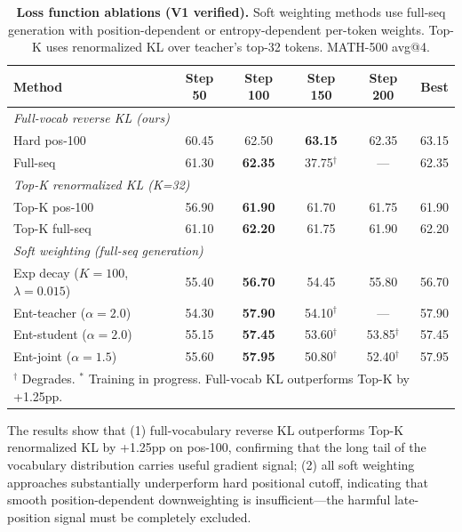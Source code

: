 \documentclass[10pt]{article}
\begin{document}
\begin{table}[!htbp]
\centering
\caption{\textbf{Loss function ablations (V1 verified).} Soft weighting methods use full-seq generation with position-dependent or entropy-dependent per-token weights. Top-K uses renormalized KL over teacher's top-32 tokens. MATH-500 avg@4.}
\label{tab:app_loss_ablation}
\small
\begin{tabular}{l cccc c}
\toprule
\textbf{Method} & \textbf{Step 50} & \textbf{Step 100} & \textbf{Step 150} & \textbf{Step 200} & \textbf{Best} \\
\midrule
\multicolumn{6}{l}{\textit{Full-vocab reverse KL (ours)}} \\
\midrule
Hard pos-100 & 60.45 & 62.50 & \textbf{63.15} & 62.35 & 63.15 \\
Full-seq & 61.30 & \textbf{62.35} & 37.75$^\dag$ & --- & 62.35 \\
\midrule
\multicolumn{6}{l}{\textit{Top-K renormalized KL (K=32)}} \\
\midrule
Top-K pos-100 & 56.90 & \textbf{61.90} & 61.70 & 61.75 & 61.90 \\
Top-K full-seq & 61.10 & \textbf{62.20} & 61.75 & 61.90 & 62.20 \\
\midrule
\multicolumn{6}{l}{\textit{Soft weighting (full-seq generation)}} \\
\midrule
Exp decay ($K{=}100$, $\lambda{=}0.015$) & 55.40 & \textbf{56.70} & 54.45 & 55.80 & 56.70 \\
Ent-teacher ($\alpha{=}2.0$) & 54.30 & \textbf{57.90} & 54.10$^\dag$ & --- & 57.90 \\
Ent-student ($\alpha{=}2.0$) & 55.15 & \textbf{57.45} & 53.60$^\dag$ & 53.85$^\dag$ & 57.45 \\
Ent-joint ($\alpha{=}1.5$) & 55.60 & \textbf{57.95} & 50.80$^\dag$ & 52.40$^\dag$ & 57.95 \\
\bottomrule
\multicolumn{6}{l}{\footnotesize $^\dag$ Degrades. $^*$ Training in progress. Full-vocab KL outperforms Top-K by +1.25pp.}
\end{tabular}
\end{table}

The results show that (1) full-vocabulary reverse KL outperforms Top-K renormalized KL by +1.25pp on pos-100, confirming that the long tail of the vocabulary distribution carries useful gradient signal; (2) all soft weighting approaches substantially underperform hard positional cutoff, indicating that smooth position-dependent downweighting is insufficient---the harmful late-position signal must be completely excluded.
\end{document}
